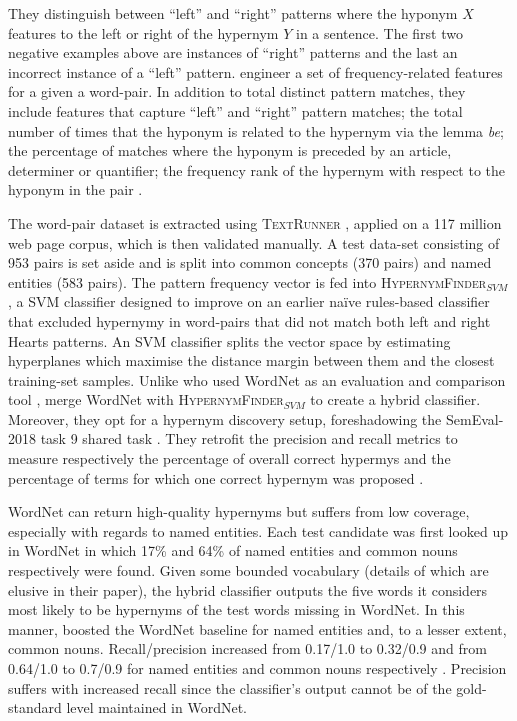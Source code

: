They distinguish between “left” and “right” patterns where the hyponym $X$ features to the left or right of the hypernym $Y$ in a sentence.  The first two negative examples above are instances of “right” patterns and the last an incorrect instance of a “left” pattern.  \citeauthor{ritter2009anyway} engineer a set of frequency-related features for a given a word-pair.  In addition to total distinct pattern matches, they include features that capture “left” and “right” pattern matches; the total number of times that the hyponym is related to the hypernym via the lemma \textit{be}; the percentage of matches where the hyponym is preceded by an article, determiner or quantifier; the frequency rank of the hypernym with respect to the hyponym in the pair \citep{ritter2009anyway}.   

The word-pair dataset is extracted using \textsc{TextRunner} \citep{banko2007open}, applied on a 117 million web page corpus, which is then validated manually.  A test data-set consisting of 953 pairs is set aside and is split into common concepts (370 pairs) and named entities (583 pairs).  The pattern frequency vector is fed into \textsc{HypernymFinder$_{SVM}$}, a \ac{SVM} classifier \citep{platt1999probabilistic} designed to improve on an earlier na\"ive rules-based classifier that excluded hypernymy in word-pairs that did not match both left and right Hearts patterns.  An \ac{SVM} classifier splits the vector space by estimating hyperplanes which maximise the distance margin between them and the closest training-set samples.    
Unlike \citeauthor{Snow2004} who used WordNet as an evaluation and comparison tool \citep{Snow2004}, \citeauthor{ritter2009anyway} merge WordNet with \textsc{HypernymFinder$_{SVM}$} to create a hybrid classifier.  
Moreover, they opt for a hypernym discovery setup, foreshadowing the SemEval-2018 task 9 shared task \citep{camacho2018semeval}.  They retrofit the precision and recall metrics to measure respectively the percentage of overall correct hypermys and the percentage of terms for which one correct hypernym was proposed \citep{ritter2009anyway}.  

WordNet can return high-quality hypernyms but suffers from low coverage, especially with regards to named entities.  Each test candidate was first looked up in WordNet in which 17\% and 64\% of named entities and common nouns respectively were found.  Given some bounded vocabulary (details of which are elusive in their paper), the hybrid classifier outputs the five words it considers most likely to be hypernyms of the test words missing in WordNet.  In this manner, \citeauthor{ritter2009anyway} boosted the WordNet baseline for named entities and, to a lesser extent, common nouns.  Recall/precision increased from 0.17/1.0 to 0.32/0.9 and from 0.64/1.0 to 0.7/0.9 for named entities and common nouns respectively \citep{ritter2009anyway}.  Precision suffers with increased recall since the classifier’s output cannot be of the gold-standard level maintained in WordNet.

